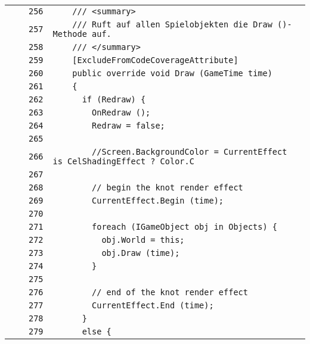 \documentclass[a4paper,10pt]{article}
\begin{document}
\begin{longtable}[l]{lrrl}
\cellcolor{gray} &  & \verb~256~ & \verb~    /// <summary>~\\
\cellcolor{gray} &  & \verb~257~ & \verb~    /// Ruft auf allen Spielobjekten die Draw ()-Methode auf.~\\
\cellcolor{gray} &  & \verb~258~ & \verb~    /// </summary>~\\
\cellcolor{gray} &  & \verb~259~ & \verb~    [ExcludeFromCodeCoverageAttribute]~\\
\cellcolor{gray} &  & \verb~260~ & \verb~    public override void Draw (GameTime time)~\\
\cellcolor{gray} &  & \verb~261~ & \verb~    {~\\
\cellcolor{gray} &  & \verb~262~ & \verb~      if (Redraw) {~\\
\cellcolor{gray} &  & \verb~263~ & \verb~        OnRedraw ();~\\
\cellcolor{gray} &  & \verb~264~ & \verb~        Redraw = false;~\\
\cellcolor{gray} &  & \verb~265~ & \verb~~\\
\cellcolor{gray} &  & \verb~266~ & \verb~        //Screen.BackgroundColor = CurrentEffect is CelShadingEffect ? Color.C~\\
\cellcolor{gray} &  & \verb~267~ & \verb~~\\
\cellcolor{gray} &  & \verb~268~ & \verb~        // begin the knot render effect~\\
\cellcolor{gray} &  & \verb~269~ & \verb~        CurrentEffect.Begin (time);~\\
\cellcolor{gray} &  & \verb~270~ & \verb~~\\
\cellcolor{gray} &  & \verb~271~ & \verb~        foreach (IGameObject obj in Objects) {~\\
\cellcolor{gray} &  & \verb~272~ & \verb~          obj.World = this;~\\
\cellcolor{gray} &  & \verb~273~ & \verb~          obj.Draw (time);~\\
\cellcolor{gray} &  & \verb~274~ & \verb~        }~\\
\cellcolor{gray} &  & \verb~275~ & \verb~~\\
\cellcolor{gray} &  & \verb~276~ & \verb~        // end of the knot render effect~\\
\cellcolor{gray} &  & \verb~277~ & \verb~        CurrentEffect.End (time);~\\
\cellcolor{gray} &  & \verb~278~ & \verb~      }~\\
\cellcolor{gray} &  & \verb~279~ & \verb~      else {~\\

\end{longtable}
\end{document}
